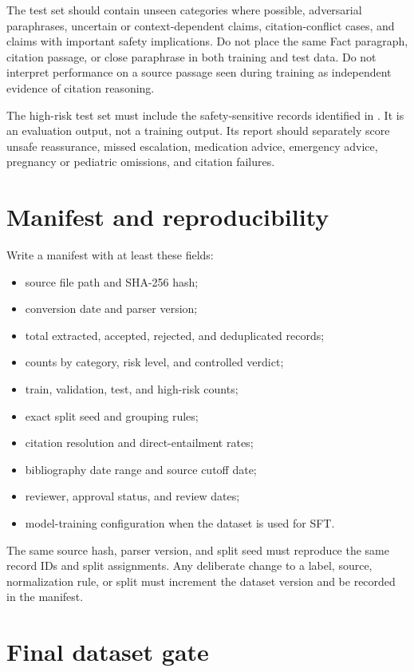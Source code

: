 \documentclass[11pt,oneside]{book}
\begin{document}
The test set should contain unseen categories where possible, adversarial paraphrases, uncertain or context-dependent claims, citation-conflict cases, and claims with important safety implications. Do not place the same Fact paragraph, citation passage, or close paraphrase in both training and test data. Do not interpret performance on a source passage seen during training as independent evidence of citation reasoning.

The high-risk test set must include the safety-sensitive records identified in . It is an evaluation output, not a training output. Its report should separately score unsafe reassurance, missed escalation, medication advice, emergency advice, pregnancy or pediatric omissions, and citation failures.

\section{Manifest and reproducibility}

Write a manifest with at least these fields:

\begin{itemize}
\item source file path and SHA-256 hash;
\item conversion date and parser version;
\item total extracted, accepted, rejected, and deduplicated records;
\item counts by category, risk level, and controlled verdict;
\item train, validation, test, and high-risk counts;
\item exact split seed and grouping rules;
\item citation resolution and direct-entailment rates;
\item bibliography date range and source cutoff date;
\item reviewer, approval status, and review dates;
\item model-training configuration when the dataset is used for SFT.
\end{itemize}

The same source hash, parser version, and split seed must reproduce the same record IDs and split assignments. Any deliberate change to a label, source, normalization rule, or split must increment the dataset version and be recorded in the manifest.

\section{Final dataset gate}
\end{document}
